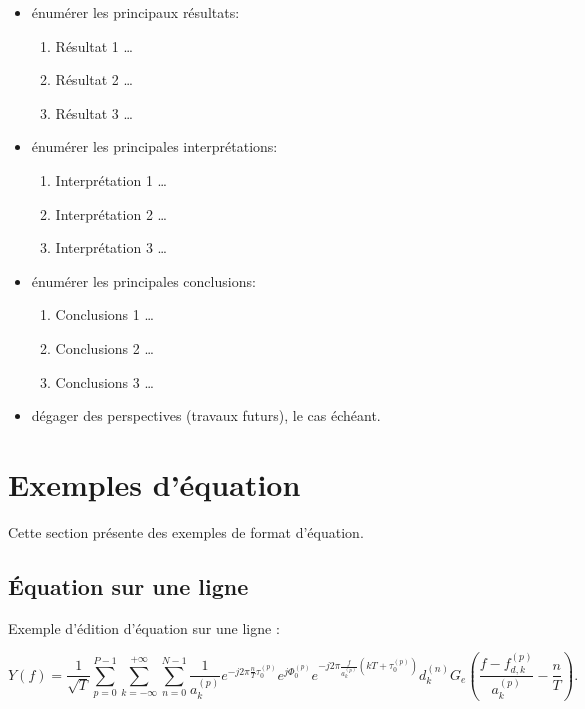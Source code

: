 \documentclass[11pt,a4paper,french]{article}
\begin{document}
\begin{itemize} %
	\item énumérer les principaux résultats:
	\begin{enumerate}
		\item Résultat 1 \ldots
		\item Résultat 2 \ldots
		\item Résultat 3 \ldots
	\end{enumerate}
	\item énumérer les principales interprétations:
	\begin{enumerate}
		\item Interprétation 1 \ldots
		\item Interprétation 2 \ldots
		\item Interprétation 3 \ldots
	\end{enumerate}
	\item énumérer les principales conclusions:
	\begin{enumerate}
		\item Conclusions 1 \ldots
		\item Conclusions 2 \ldots
		\item Conclusions 3 \ldots
	\end{enumerate}
	\item dégager des perspectives (travaux futurs), le cas échéant.
\end{itemize}

\newpage
\section{Exemples d'équation}\label{sec:S_EQ}

Cette section présente des exemples de format d'équation.

\subsection{Équation sur une ligne}\label{sec:SS_EQ1}

Exemple d'édition d'équation sur une ligne :

\begin{equation}
\label{E_AA_OFDM_BB_TMD_RX3_FREQ4}
Y(f) = \frac{1}{\sqrt{T}}\sum_{p=0}^{P-1}\sum_{k=-\infty}^{+\infty}\sum_{n=0}^{N-1}\frac{1}{a_k^{(p)}}
       e^{-j 2\pi\frac{n}{T}\tau_0^{(p)}}e^{j\Phi_0^{(p)}}
			 e^{-j2\pi \frac{f}{a_k^{(p)}}(kT+\tau_0^{(p)})}
			 d_k^{(n)}G_e(\frac{f-f_{d,k}^{(p)}}{a_k^{(p)}}-\frac{n}{T}).
\end{equation}
\end{document}
